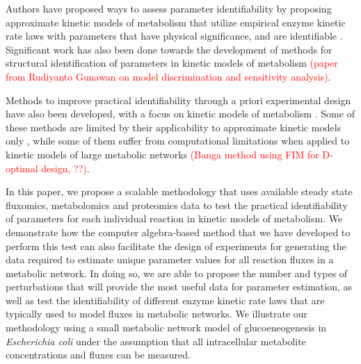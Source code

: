 \documentclass[10pt]{article}
\begin{document}
	Authors have proposed ways to assess parameter identifiability by proposing approximate kinetic models of metabolism that utilize empirical enzyme kinetic rate laws with parameters that have physical significance, and are identifiable \parencite{Heijnen2005,Smallbone2007}. Significant work has also been done towards the development of methods for structural identification of parameters in kinetic models of metabolism \parencite{Ljung1994,Nikerel2009,Berthoumieux2013,Raue2014}\textcolor{red}{(paper from Rudiyanto Gunawan on model discrimination and sensitivity analysis)}.	
	
	Methods to improve practical identifiability through a priori experimental design have also been developed, with a focus on kinetic models of metabolism \parencite{Gadkar2005a,Vanlier2014a,Raue2014}. Some of these methods are limited by their applicability to approximate kinetic models only \parencite{Nikerel2009,Berthoumieux2013}, while some of them suffer from computational limitations when applied to kinetic models of large metabolic networks \parencite{Gadkar2005a,Raue2014}\textcolor{red}{(Banga method using FIM for D-optimal design, ??)}. 	
	
	In this paper, we propose a scalable methodology that uses available steady state fluxomics, metabolomics and proteomics data to test the practical identifiability of parameters for each individual reaction in kinetic models of metabolism. We demonstrate how the computer algebra-based method that we have developed to perform this test can also facilitate the design of experiments for generating the data required to estimate unique parameter values for all reaction fluxes in a metabolic network. In doing so, we are able to propose the number and types of perturbations that will provide the most useful data for parameter estimation, as well as test the identifiability of different enzyme kinetic rate laws that are typically used to model fluxes in metabolic networks. We illustrate our methodology using a small metabolic network model of glucoeneogenesis in \textit{Escherichia coli} \parencite{Kotte2014, Srinivasan2017} under the assumption that all intracellular metabolite concentrations and fluxes can be measured. 
		
\end{document}
